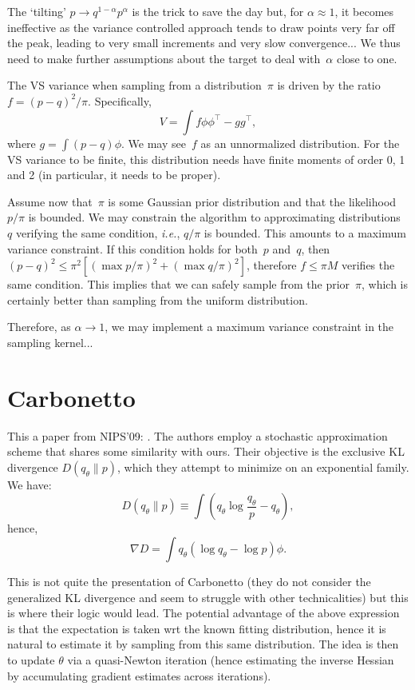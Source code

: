 \documentclass{article}
\begin{document}
The `tilting' $p\to q^{1-\alpha}p^\alpha$ is the trick to save the day but, for $\alpha\approx 1$, it becomes ineffective as the variance controlled approach tends to draw points very far off the peak, leading to very small increments and very slow convergence... We thus need to make further assumptions about the target to deal with~$\alpha$ close to one. 

The VS variance when sampling from a distribution~$\pi$ is driven by the ratio $f={(p-q)^2}/{\pi}$. Specifically,
$$
V = \int f \phi \phi^\top
- gg^\top,
$$
where $g=\int (p-q)\phi$. We may see~$f$ as an unnormalized distribution. For the VS variance to be finite, this distribution needs have finite moments of order 0, 1 and 2 (in particular, it needs to be proper). 

Assume now that~$\pi$ is some Gaussian prior distribution and that the likelihood $p/\pi$ is bounded. We may constrain the algorithm to approximating distributions~$q$ verifying the same condition, {\em i.e.}, $q/\pi$ is bounded. This amounts to a maximum variance constraint. If this condition holds for both~$p$ and~$q$, then $(p-q)^2 \leq \pi^2 [(\max p/\pi)^2 + (\max q/\pi)^2]$, therefore $f\leq \pi M$ verifies the same condition. This implies that we can safely sample from the prior~$\pi$, which is certainly better than sampling from the uniform distribution.

Therefore, as $\alpha\to 1$, we may implement a maximum variance constraint in the sampling kernel... 

\section{Carbonetto}

This a paper from NIPS'09: \cite{Carbonetto-09}. The authors employ a stochastic approximation scheme that shares some similarity with ours. Their objective is the exclusive KL divergence $D(q_\theta\|p)$, which they attempt to minimize on an exponential family. We have:
$$
D(q_\theta\|p) \equiv \int (q_\theta \log \frac{q_\theta}{p} - q_\theta),
$$
hence,
$$
\nabla D = \int q_\theta (\log q_\theta - \log p) \phi.
$$

This is not quite the presentation of Carbonetto (they do not consider the generalized KL divergence and seem to struggle with other technicalities) but this is where their logic would lead. The potential advantage of the above expression is that the expectation is taken wrt the known fitting distribution, hence it is natural to estimate it by sampling from this same distribution. The idea is then to update $\theta$ via a quasi-Newton iteration (hence estimating the inverse Hessian by accumulating gradient estimates across iterations). 
\end{document}
